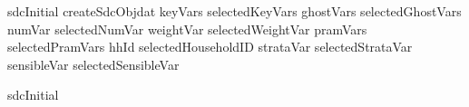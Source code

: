 \documentclass[letterpaper,10pt,english]{sphinxmanual}
\begin{document}
\begin{sphinxVerbatim}[commandchars=\\\{\},numbers=left,firstnumber=1,stepnumber=1]
sdcInitial  createSdcObjdat          
                                                keyVars      selectedKeyVars
                                            ghostVars    selectedGhostVars
                                            numVar       selectedNumVar
                                            weightVar    selectedWeightVar
                                            pramVars     selectedPramVars
                                            hhId         selectedHouseholdID
                           strataVar    selectedStrataVar
                           sensibleVar  selectedSensibleVar

sdcInitial


\end{sphinxVerbatim}
\end{document}
